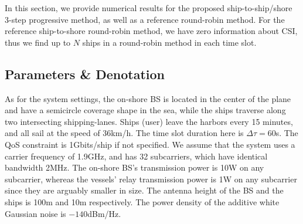 \documentclass[conference]{IEEEtran}
\begin{document}
 In this section, we provide numerical results for the proposed ship-to-ship/shore 3-step progressive method, as well as a reference round-robin method. 
 For the reference ship-to-shore round-robin method, we have zero information about CSI, thus we find up to $N$ ships in a round-robin method in each time slot. 
 
 \subsection{Parameters \& Denotation}
 
 
 
 
 As for the system settings, the on-shore BS is located in the center of the plane and have a semicircle coverage shape in the sea, while the ships traverse along two intersecting shipping-lanes. 
 Ships (user) leave the harbors every 15 minutes, and all sail at the speed of 36km/h. The time slot duration here is $\Delta \tau = 60$s. The QoS constraint is 1Gbits/ship if not specified. We assume that the system uses a carrier frequency of 1.9GHz, and has 32 subcarriers, which have identical bandwidth 2MHz. The on-shore BS's transmission power is 10W on any subcarrier, whereas the vessels' relay transmission power is 1W on any subcarrier since they are arguably smaller in size. The antenna height of the BS and the ships is 100m and 10m respectively. The power density of the additive white Gaussian noise is ${-140}$dBm/Hz. 
 
\end{document}
